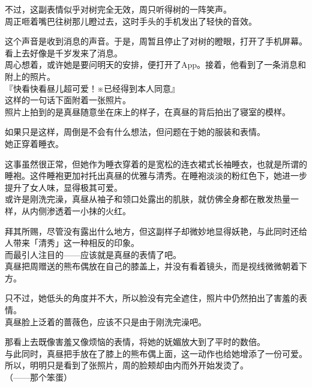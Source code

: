 不过，这副表情似乎对树完全无效，周只听得树的一阵笑声。\\

周正咂着嘴巴往树那儿瞪过去，这时手头的手机发出了轻快的音效。

这个声音是收到消息的声音。于是，周暂且停止了对树的瞪眼，打开了手机屏幕。看上去好像是千岁发来了消息。\\

周心想着，或许她是要问明天的安排，便打开了App。接着，他看到了一条消息和附上的照片。\\

『快看快看昼儿超可爱！※已经得到本人同意』\\

这样的一句话下面附着一张照片。\\

照片上拍到的是真昼随意坐在床上的样子，在真昼的背后拍出了寝室的模样。

如果只是这样，周倒是不会有什么想法，但问题在于她的服装和表情。\\

她正穿着睡衣。

这事虽然很正常，但她作为睡衣穿着的是宽松的连衣裙式长袖睡衣，也就是所谓的睡袍。这件睡袍更加衬托出真昼的优雅与清秀。在睡袍淡淡的粉红色下，她进一步提升了女人味，显得极其可爱。\\

或许是刚洗完澡，真昼从袖子和领口处露出的肌肤，就仿佛全身都在散发热量一样，从内侧渗透着一小抹的火红。

拜其所赐，尽管没有露出什么地方，但这副样子却微妙地显得妖艳，与此同时还给人带来「清秀」这一种相反的印象。\\

而最引人注目的——应该就是真昼的表情了吧。\\

真昼把周赠送的熊布偶放在自己的膝盖上，并没有看着镜头，而是视线微微朝着下方。

只不过，她低头的角度并不大，所以脸没有完全遮住，照片中仍然拍出了害羞的表情。\\

真昼脸上泛着的蔷薇色，应该不只是由于刚洗完澡吧。

那看上去既像害羞又像烦恼的表情，将她的妩媚放大到了平时的数倍。\\

与此同时，真昼把手放在了膝上的熊布偶上面，这一动作也给她增添了一份可爱。所以，明明只是看到了张照片，周的脸颊却由内而外开始发烫了。\\

（——那个笨蛋）\\

